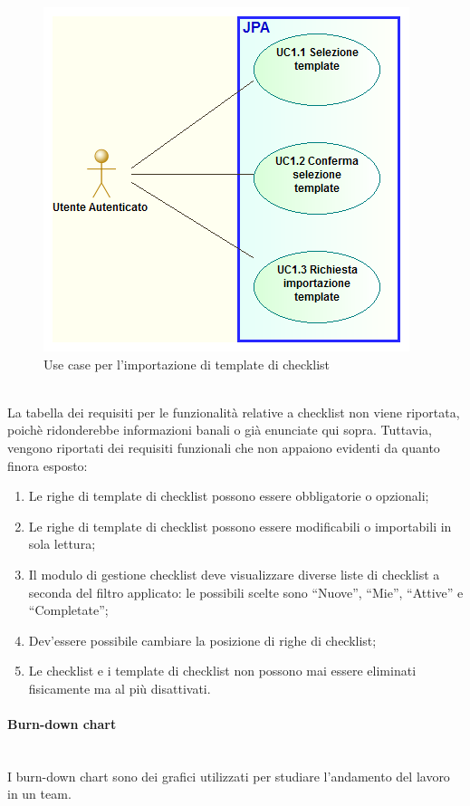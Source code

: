 \begin{figure}%
\centering
\includegraphics[width=.5\columnwidth]{immagini/UC0Import}
\caption{Use case per l'importazione di template di checklist}
\label{fig:uc-import}%
\end{figure} \mbox{} \\

La tabella dei requisiti per le funzionalità relative a checklist non viene
riportata, poichè ridonderebbe informazioni banali o già enunciate qui sopra.
Tuttavia, vengono riportati dei requisiti funzionali che non appaiono evidenti
da quanto finora esposto:

\begin{enumerate}
\item Le righe di template di checklist possono essere obbligatorie o
  opzionali;
\item Le righe di template di checklist possono essere modificabili o
  importabili in sola lettura;
\item Il modulo di gestione checklist deve visualizzare diverse liste di
  checklist a seconda del filtro applicato: le possibili scelte sono
  ``Nuove'', ``Mie'', ``Attive'' e ``Completate'';
\item Dev'essere possibile cambiare la posizione di righe di checklist;
\item Le checklist e i template di checklist non possono mai essere eliminati
  fisicamente ma al più disattivati.
\end{enumerate}

\paragraph{Burn-down chart} \mbox{} \\

I burn-down chart sono dei grafici utilizzati per studiare l'andamento del
lavoro in un team.

